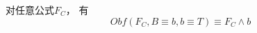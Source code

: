 %

\begin{lemma}\label{3:UPSSE-lemma}
对任意公式$F_C$， 有
\begin{equation}
Obf(F_C,B\equiv b,{b\equiv T})\equiv F_C\wedge b
\end{equation}
\end{lemma}

